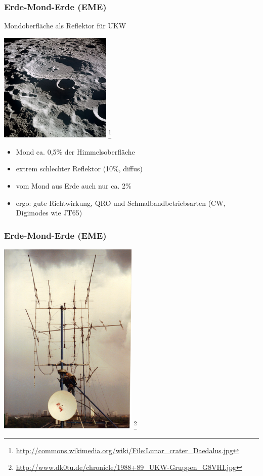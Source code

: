 \begin{frame}
    \frametitle{Erde-Mond-Erde (EME)}

    Mondoberfläche als Reflektor für UKW

    \begin{center}
        \includegraphics[width=0.4\textwidth]{bv11/Lunar_crater_Daedalus.jpg}
        \footnote{\tiny \url{http://commons.wikimedia.org/wiki/File:Lunar_crater_Daedalus.jpg}}
    \end{center}

    \begin{itemize}
        \item Mond ca. 0,5\% der Himmelsoberfläche
        \item extrem schlechter Reflektor (10\%, diffus)
        \item vom Mond aus Erde auch nur ca. 2\%
        \item ergo: gute Richtwirkung, QRO und Schmalbandbetriebsarten (CW, Digimodes wie JT65)
    \end{itemize}

\end{frame}

\begin{frame}
    \frametitle{Erde-Mond-Erde (EME)}

    \begin{center}
        \includegraphics[width=0.5\textwidth]{bv11/1988+89_UKW-Gruppen_G8VHI.jpg}
        \footnote{\tiny \url{http://www.dk0tu.de/chronicle/1988+89_UKW-Gruppen_G8VHI.jpg}}
    \end{center}

\end{frame}

